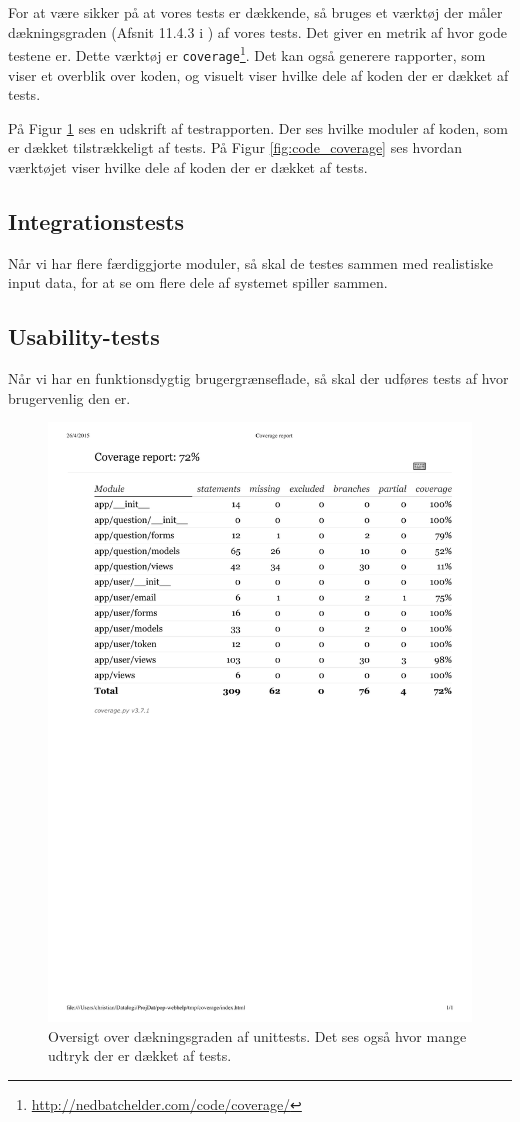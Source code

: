 \documentclass[11pt, a4paper]{article}
\begin{document}
For at være sikker på at vores tests er dækkende, så bruges et værktøj der måler dækningsgraden (Afsnit 11.4.3 i \cite{OOSE})  af vores tests. Det giver en metrik af hvor gode testene er. Dette værktøj er \verb!coverage!\footnote{\url{http://nedbatchelder.com/code/coverage/}}. Det kan også generere rapporter, som viser et overblik over koden, og visuelt viser hvilke dele af koden der er dækket af tests.

På Figur \ref{fig:testcoverage} ses en udskrift af testrapporten. Der ses hvilke moduler af koden, som er dækket tilstrækkeligt af tests. På Figur \ref{fig:code_coverage} ses hvordan værktøjet viser hvilke dele af koden der er dækket af tests.

\subsection{Integrationstests}
\label{sub:integrationstests}
Når vi har flere færdiggjorte moduler, så skal de testes sammen med realistiske input data, for at se om flere dele af systemet spiller sammen.

\subsection{Usability-tests}
\label{sub:usability_tests}
Når vi har en funktionsdygtig brugergrænseflade, så skal der udføres tests af hvor brugervenlig den er.

\begin{figure}[h]
    \centering
    \includegraphics[width=0.8\linewidth]{figures/testcoverage.pdf}
    \caption{Oversigt over dækningsgraden af unittests. Det ses også hvor mange udtryk der er dækket af tests.}
    \label{fig:testcoverage}
\end{figure}
\end{document}
